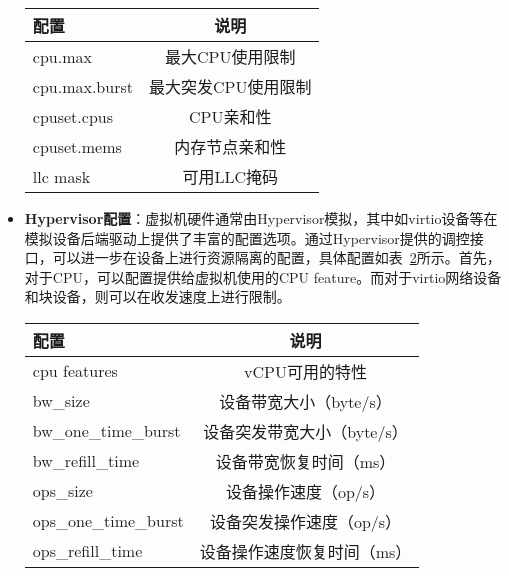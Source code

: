 \begin{itemize}
\begin{table}[H]
    \label{tab:cz_cgroup_config}
    \footnotesize%
    \setlength{\tabcolsep}{30pt}%
    \renewcommand{\arraystretch}{1.25}%
    \centering
    \begin{tabular}{lc}
        \hline
        配置 & 说明\\
        \hline
        cpu.max & 最大CPU使用限制 \\
        cpu.max.burst & 最大突发CPU使用限制 \\
        cpuset.cpus & CPU亲和性 \\
        cpuset.mems & 内存节点亲和性 \\
        llc mask& 可用LLC掩码 \\
        \hline
    \end{tabular}
\end{table}

    \item \textbf{Hypervisor配置}：虚拟机硬件通常由Hypervisor模拟，其中如virtio设备等在模拟设备后端驱动上提供了丰富的配置选项。通过Hypervisor提供的调控接口，可以进一步在设备上进行资源隔离的配置，具体配置如表~\ref{tab:cz_hv_config}所示。首先，对于CPU，可以配置提供给虚拟机使用的CPU feature。而对于virtio网络设备和块设备，则可以在收发速度上进行限制。

\begin{table}[H]
    \label{tab:cz_hv_config}
    \footnotesize%
    \setlength{\tabcolsep}{30pt}%
    \renewcommand{\arraystretch}{1.25}%
    \centering
    \begin{tabular}{lc}
        \hline
        配置 & 说明\\
        \hline
        cpu features& vCPU可用的特性\\
        bw\_size & 设备带宽大小（byte/s）\\
        bw\_one\_time\_burst & 设备突发带宽大小（byte/s）\\
        bw\_refill\_time & 设备带宽恢复时间（ms）\\
        ops\_size & 设备操作速度（op/s）\\
        ops\_one\_time\_burst & 设备突发操作速度（op/s）\\
        ops\_refill\_time & 设备操作速度恢复时间（ms）\\
        \hline
    \end{tabular}
\end{table}

\end{itemize}


